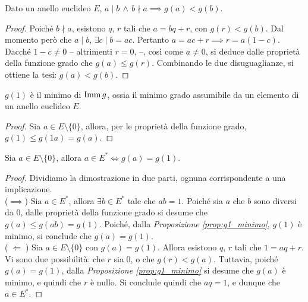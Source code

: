 \begin{proposition}
    Dato un anello euclideo $E$, $a \mid b \,\land\, b \nmid a \implies g(a) < g(b)$.
\end{proposition}

\begin{proof}
    Poiché $b \nmid a$, esistono $q$, $r$ tali che $a = bq + r$, con
    $g(r) < g(b)$. Dal momento però che $a \mid b$, $\exists c \mid
        b = ac$. Pertanto $a = ac + r \implies r = a(1-c)$. Dacché $1-c \neq 0$ --
    altrimenti $r=0$, \Lightning{} --, così come $a \neq 0$, si deduce
    dalle proprietà della funzione grado che $g(a) \leq g(r)$.
    Combinando le due disuguaglianze, si ottiene la
    tesi: $g(a) < g(b)$.
\end{proof}

\begin{proposition}
    \label{prop:g1_minimo}
    $g(1)$ è il minimo di $\operatorname{Imm} g$, ossia il minimo grado assumibile
    da un elemento di un anello euclideo $E$.
\end{proposition}

\begin{proof}
    Sia $a \in E \setminus \{0\}$, allora, per le proprietà della funzione
    grado, $g(1) \leq g(1a) = g(a)$.
\end{proof}

\begin{theorem}
    Sia $a \in E \setminus \{0\}$, allora $a \in E^* \iff g(a) = g(1)$.
\end{theorem}

\begin{proof}
    Dividiamo la dimostrazione in due parti, ognuna corrispondente a una implicazione. \\

    ($\implies$) \;Sia $a \in E^*$, allora $\exists b \in E^*$ tale che $ab=1$. Poiché
    sia $a$ che $b$ sono diversi da $0$, dalle proprietà della funzione grado si
    desume che $g(a) \leq g(ab) = g(1)$. Poiché, dalla \textit{Proposizione \ref{prop:g1_minimo}},
    $g(1)$ è minimo, si conclude che $g(a) = g(1)$. \\

    ($\;\Longleftarrow\;$) \;Sia $a \in E \setminus \{0\}$ con $g(a) = g(1)$. Allora
    esistono $q$, $r$ tali che $1 = aq + r$. Vi sono due possibilità: che $r$ sia $0$, o
    che $g(r) < g(a)$. Tuttavia, poiché $g(a)=g(1)$, dalla \textit{Proposizione \ref{prop:g1_minimo}} si desume che $g(a)$ è minimo, e quindi che
    $r$ è nullo. Si conclude quindi che $aq = 1$, e dunque che $a \in E^*$.
\end{proof}

